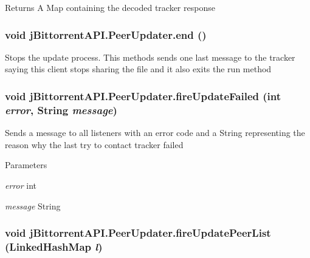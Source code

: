 \begin{DoxyReturn}{Returns}
A Map containing the decoded tracker response 
\end{DoxyReturn}
\hypertarget{classj_bittorrent_a_p_i_1_1_peer_updater_aa490aed641391fcc6777449c44872c25}{
\subsubsection[{end}]{\setlength{\rightskip}{0pt plus 5cm}void jBittorrentAPI.PeerUpdater.end ()}}
\label{classj_bittorrent_a_p_i_1_1_peer_updater_aa490aed641391fcc6777449c44872c25}
Stops the update process. This methods sends one last message to the tracker saying this client stops sharing the file and it also exits the run method \hypertarget{classj_bittorrent_a_p_i_1_1_peer_updater_a2dfaa68f550f920bc4099f4c6aee29a3}{
\subsubsection[{fireUpdateFailed}]{\setlength{\rightskip}{0pt plus 5cm}void jBittorrentAPI.PeerUpdater.fireUpdateFailed (int {\em error}, \/  String {\em message})}}
\label{classj_bittorrent_a_p_i_1_1_peer_updater_a2dfaa68f550f920bc4099f4c6aee29a3}
Sends a message to all listeners with an error code and a String representing the reason why the last try to contact tracker failed 
\begin{DoxyParams}{Parameters}
\item[{\em error}]int \item[{\em message}]String \end{DoxyParams}
\hypertarget{classj_bittorrent_a_p_i_1_1_peer_updater_a660e9bcab08ec687992ce4ae43a21078}{
\subsubsection[{fireUpdatePeerList}]{\setlength{\rightskip}{0pt plus 5cm}void jBittorrentAPI.PeerUpdater.fireUpdatePeerList (LinkedHashMap {\em l})}}
